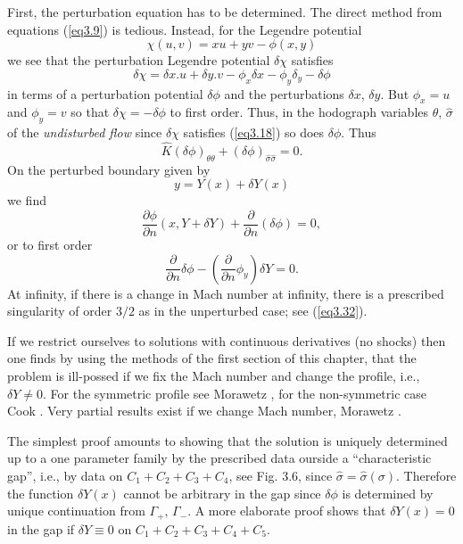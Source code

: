 First, the perturbation equation has to be determined. The direct method from equations (\ref{eq3.9}) is tedious. Instead, for the Legendre potential
$$
\chi (u,v) = xu + yv - \phi (x,y)
$$
we see that the perturbation Legendre potential $\delta \chi$ satisfies
$$
\delta \chi = \delta x. u + \delta y. v - \phi_x \delta x - \phi _y \delta _y - \delta \phi
$$
in terms of a perturbation potential $\delta \phi$ and the perturbations $\delta x$, $\delta y$. But $\phi_x = u$ and $\phi_y =v$ so that $\delta \chi = - \delta \phi$ to first order. Thus, in the hodograph variables $\theta$, $\hat{\sigma}$ of the {\em undisturbed flow} since $\delta \chi$ satisfies (\ref{eq3.18}) so does $\delta \phi$. Thus
\begin{equation*}
\hat{K} (\delta \phi)_{\theta \theta} + (\delta \phi)_{\hat{\sigma} \hat{\sigma}} = 0. 
\tag{3.33}\label{eq3.33}
\end{equation*}\pageoriginale
On the perturbed boundary given by 
$$
y = Y (x) + \delta Y (x)
$$
we find 
$$
\frac{\partial \phi}{\partial n} (x,Y + \delta Y) + \frac{\partial}{\partial n} (\delta \phi) = 0,
$$
or to first order 
\begin{equation*}
\frac{\partial}{\partial n} \delta \phi - (\frac{\partial}{\partial n} \phi_y) \delta Y = 0. \tag{3.34}\label{eq3.34}
\end{equation*}
At infinity, if there is a change in Mach number at infinity, there is a prescribed singularity of order $3/2$ as in the unperturbed case; see (\ref{eq3.32}).

If we restrict ourselves to solutions with continuous derivatives (no shocks) then one finds by using the methods of the first section of this chapter, that the problem is ill-possed if we fix the Mach number and change the profile, i.e., $\delta Y \neq 0$. For the symmetric profile see Morawetz \cite{key28}, for the non-symmetric case Cook \cite{key5}. Very partial results exist if we change Mach number, Morawetz \cite[III]{key29}.

The simplest proof amounts to showing that the solution is uniquely determined up to a one parameter family by the prescribed data ourside a ``characteristic gap'', i.e., by data on $C_1+ C_2 + C_3 + C_4$, see Fig. 3.6, since $\hat{\sigma} = \hat{\sigma} (\sigma)$. Therefore the function $\delta Y(x)$ cannot be arbitrary in the gap since $\delta \phi$ is determined by unique continuation from $\Gamma_+$, $\Gamma_-$. A more elaborate proof shows that $\delta Y (x) = 0$ in the gap if $\delta Y \equiv 0$ on $C_1+ C_2 + C_3 + C_4 + C_5$.

